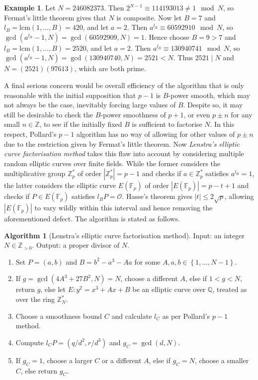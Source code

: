 \documentclass{article}
\newcommand{\F}{\mathbb{F}}
\newcommand{\Z}{\mathbb{Z}}
\newcommand{\Q}{\mathbb{Q}}
\newcommand{\rb}[1]{\left( #1 \right)}
\newcommand{\cb}[1]{\left\{ #1 \right\}}
\newcommand{\abs}[1]{\left\lvert #1 \right\rvert}
\theoremstyle{definition}\newtheorem*{definition}{Definition}
\theoremstyle{definition}\newtheorem*{example}{Example}
\theoremstyle{definition}\newtheorem*{remark}{Remark}
\newtheorem{algorithm}[proposition]{Algorithm}
\begin{document}
\begin{example}
Let $ N = 246082373 $. Then $ 2^{N - 1} \equiv 114193013 \ne 1 \mod N $, so Fermat's little theorem gives that $ N $ is composite. Now let $ B = 7 $ and $ l_B = \text{lcm}\rb{1, \dots, B} = 420 $, and let $ a = 2 $. Then $ a^{l_B} \equiv 60592910 \mod N $, so $ \gcd\rb{a^{l_B} - 1, N} = \gcd\rb{60592909, N} = 1 $. Hence choose $ B = 9 > 7 $ and $ l_B = \text{lcm}\rb{1, \dots, B} = 2520 $, and let $ a = 2 $. Then $ a^{l_B} \equiv 130940741 \mod N $, so $ \gcd\rb{a^{l_B} - 1, N} = \gcd\rb{130940740, N} = 2521 < N $. Thus $ 2521 \mid N $ and $ N = \rb{2521}\rb{97613} $, which are both prime.
\end{example}

A final serious concern would be overall efficiency of the algorithm that is only reasonable with the initial supposition that $ p - 1 $ is $ B $-power smooth, which may not always be the case, inevitably forcing large values of $ B $. Despite so, it may still be desirable to check the $ B $-power smoothness of $ p + 1 $, or even $ p \pm n $ for any small $ n \in \Z $, to see if the initially fixed $ B $ is sufficient to factorise $ N $. In this respect, Pollard's $ p - 1 $ algorithm has no way of allowing for other values of $ p \pm n $ due to the restriction given by Fermat's little theorem. Now \emph{Lenstra's elliptic curve factorisation method} takes this flaw into account by considering multiple random elliptic curves over finite fields. While the former considers the multiplicative group $ \Z_p^* $ of order $ \abs{\Z_p^*} = p - 1 $ and checks if $ a \in \Z_p^* $ satisfies $ a^{l_B} = 1 $, the latter considers the elliptic curve $ E\rb{\F_p} $ of order $ \abs{E\rb{\F_p}} = p - t + 1 $ and checks if $ P \in E\rb{\F_p} $ satisfies $ l_BP = \mathcal{O} $. Hasse's theorem gives $ \abs{t} \le 2\sqrt{p} $, allowing $ \abs{E\rb{\F_p}} $ to vary wildly within this interval and hence removing the aforementioned defect. The algorithm is stated as follows.

\begin{algorithm}[Lenstra's elliptic curve factorisation method]
Input: an integer $ N \in \Z_{> 0} $. Output: a proper divisor of $ N $.
\begin{enumerate}
\item Set $ P = \rb{a, b} $ and $ B = b^2 - a^3 - Aa $ for some $ A, a, b \in \cb{1, \dots, N - 1} $.
\item If $ g = \gcd\rb{4A^3 + 27B^2, N} = N $, choose a different $ A $, else if $ 1 < g < N $, return $ g $, else let $ E : y^2 = x^3 + Ax + B $ be an elliptic curve over $ \Q $, treated as over the ring $ \Z_N^* $.
\item Choose a smoothness bound $ C $ and calculate $ l_C $ as per Pollard's $ p - 1 $ method.
\item Compute $ l_CP = \rb{q / d^2, r / d^3} $ and $ g_C = \gcd\rb{d, N} $.
\item If $ g_C = 1 $, choose a larger $ C $ or a different $ A $, else if $ g_C = N $, choose a smaller $ C $, else return $ g_C $.
\end{enumerate}
\end{algorithm}
\end{document}
